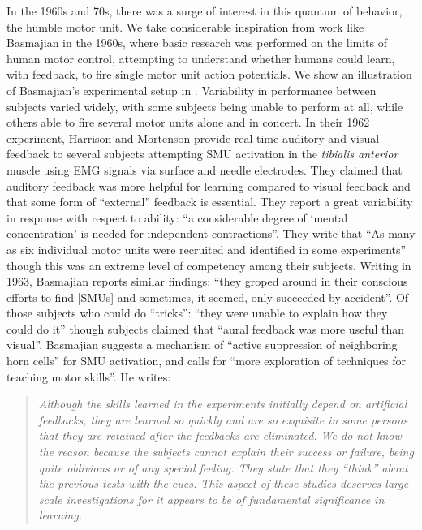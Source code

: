 \documentclass[../main.tex]{subfiles}
\begin{document}
In the 1960s and 70s, there was a surge of interest in this quantum of behavior, the humble motor unit. We take considerable inspiration from work like Basmajian in the 1960s, where basic research was performed on the limits of human motor control, attempting to understand whether humans could learn, with feedback, to fire single motor unit action potentials. We show an illustration of Basmajian's experimental setup in . Variability in performance between subjects varied widely, with some subjects being unable to perform at all, while others able to fire several motor units alone and in concert. In their 1962 experiment, Harrison and Mortenson provide real-time auditory and visual feedback to several subjects attempting SMU activation in the \textit{tibialis anterior} muscle using EMG signals via surface and needle electrodes. They claimed that auditory feedback was more helpful for learning compared to visual feedback and that some form of ``external'' feedback is essential. They report a great variability in response with respect to ability: ``a considerable degree of `mental concentration' is needed for independent contractions''\cite{Harrison1962}. They write that ``As many as six individual motor units were recruited and identified in some experiments'' though this was an extreme level of competency among their subjects. Writing in 1963, Basmajian reports similar findings: ``they groped around in their conscious efforts to find [SMUs] and sometimes, it seemed, only succeeded by accident''. Of those subjects who could do ``tricks'': ``they were unable to explain how they could do it'' though subjects claimed that ``aural feedback was more useful than visual''\cite{Basmajian1963}. Basmajian suggests a mechanism of ``active suppression of neighboring horn cells'' for SMU activation, and calls for ``more exploration of techniques for teaching motor skills''. He writes:
%
\begin{quotation}
\noindent\textit{Although the skills learned in the experiments initially depend on artificial feedbacks, they are learned so quickly and are so exquisite in some persons that they are retained after the feedbacks are eliminated. We do not know the reason because the subjects cannot explain their success or failure, being quite oblivious or of any special feeling. They state that they ``think'' about the previous tests with the cues. This aspect of these studies deserves large-scale investigations for it appears to be of fundamental significance in learning.}
\end{quotation}
\end{document}
